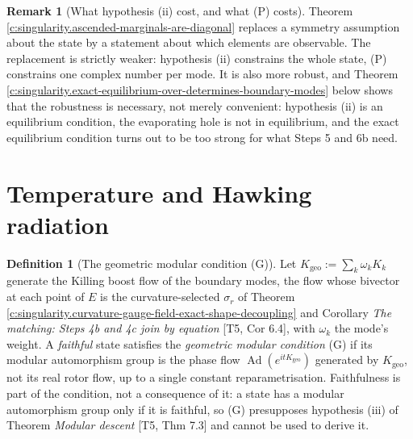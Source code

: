 \documentclass[11pt]{article}
\theoremstyle{definition}
\newtheorem{definition}[theorem]{Definition}
\newtheorem{remark}[theorem]{Remark}
\theoremstyle{plain}
\begin{document}
\begin{remark}[What hypothesis (ii) cost, and what (P) costs]\label{c:note.singularity.what-hypothesis-ii-cost-what-p}
Theorem \ref{c:singularity.ascended-marginals-are-diagonal} replaces a symmetry assumption about the state by a statement about which elements are observable. The replacement is strictly weaker: hypothesis (ii) constrains the whole state, (P) constrains one complex number per mode. It is also more robust, and Theorem \ref{c:singularity.exact-equilibrium-over-determines-boundary-modes} below shows that the robustness is necessary, not merely convenient: hypothesis (ii) is an equilibrium condition, the evaporating hole is not in equilibrium, and the exact equilibrium condition turns out to be too strong for what Steps 5 and 6b need.
\end{remark}

\section{Temperature and Hawking radiation}

\begin{definition}[The geometric modular condition (G)]\label{c:obj.singularity.geometric-modular-condition-g}
Let $K_{\mathrm{geo}} := \sum_k \omega_k K_k$ generate the Killing boost flow of the boundary modes, the flow whose bivector at each point of $E$ is the curvature-selected $\sigma_r$ of Theorem \ref{c:singularity.curvature-gauge-field-exact-shape-decoupling} and Corollary \emph{The matching: Steps 4b and 4c join by equation} [T5, Cor 6.4], with $\omega_k$ the mode's weight. A \emph{faithful} state satisfies the \emph{geometric modular condition} (G) if its modular automorphism group is the phase flow $\operatorname{Ad}(e^{itK_{\mathrm{geo}}})$ generated by $K_{\mathrm{geo}}$, not its real rotor flow, up to a single constant reparametrisation. Faithfulness is part of the condition, not a consequence of it: a state has a modular automorphism group only if it is faithful, so (G) presupposes hypothesis (iii) of Theorem \emph{Modular descent} [T5, Thm 7.3] and cannot be used to derive it.
\end{definition}
\end{document}
